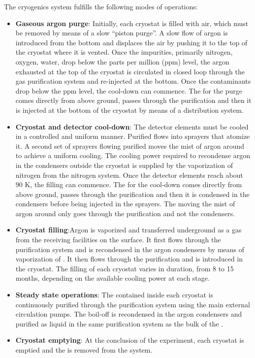 The cryogenics system fulfills the following modes of operations:
\begin{itemize}
  \item {\bf Gaseous argon purge}: Initially, each cryostat is filled
    with air, which must be removed by means of a slow  ``piston
    purge''.  A slow flow of argon is introduced from the bottom and
    displaces the air by pushing it to the top of the cryostat where
    it is vented.  Once the impurities, primarily nitrogen, oxygen,
    water, drop below the parts per million (ppm) level, the argon
    exhausted at the top of the cryostat is circulated in closed loop
    through the gas purification system and re-injected at the
    bottom. Once the contaminants drop below the ppm level, the
    cool-down can commence. The  for the purge comes directly from
    above ground, passes through the  purification and then it is
    injected at the bottom of the cryostat by means of a 
    distribution system.
  \item {\bf Cryostat and detector cool-down}: The detector elements
    must be cooled in a controlled and uniform manner. Purified 
    flows into sprayers that atomize it. A second set of sprayers
    flowing purified  moves the mist of argon around to achieve a
    uniform cooling. The cooling power required to recondense argon in
    the condensers outside the cryostat is supplied by the
    vaporization of nitrogen from the nitrogen system. Once the
    detector elements reach about 90 K, the filling can commence. The
     for the cool-down comes directly from above ground, passes
    through the  purification and then it is condensed in the
    condensers before being injected in the sprayers. The  moving
    the mist of argon around only goes through the  purification
    and not the condensers.
  \item {\bf Cryostat filling}:Argon is vaporized and transferred
    underground as a gas from the receiving facilities on the surface.
    It first flows through the  purification system and is
    recondensed in the argon condensers by means of vaporization of
    .  It then flows through the  purification and is introduced
    in the cryostat. The filling of each cryostat varies in duration,
    from 8 to 15 months, depending on the available cooling power at
    each stage.
  \item{\bf Steady state operations}: The  contained inside each
    cryostat is continuously purified through the  purification
    system using the main external  circulation pumps. The boil-off
     is recondensed in the argon condensers and purified as liquid
    in the same  purification system as the bulk of the .
  \item{\bf Cryostat emptying}: At the conclusion of the experiment,
    each cryostat is emptied and the  is removed from the system.
\end{itemize}

